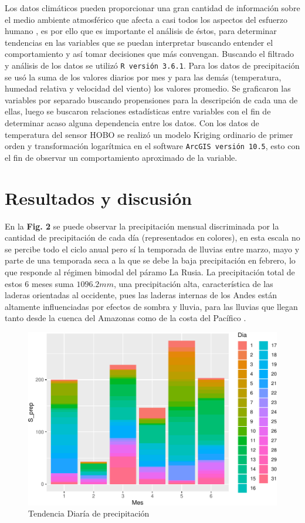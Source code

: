 \documentclass[conference,final,]{IEEEtran}
\makeatletter
\def\maxwidth{\ifdim\Gin@nat@width>\linewidth\linewidth
\else\Gin@nat@width\fi}
\let\Oldincludegraphics\includegraphics
\renewcommand{\includegraphics}[1]{\Oldincludegraphics[width=\maxwidth]{#1}}
\makeatother
\begin{document}
Los datos climáticos pueden proporcionar una gran cantidad de
información sobre el medio ambiente atmosférico que afecta a casi todos
los aspectos del esfuerzo humano \cite{Bala}, es por ello que es
importante el análisis de éstos, para determinar tendencias en las
variables que se puedan interpretar buscando entender el comportamiento
y así tomar decisiones que más convengan. Buscando el filtrado y
análisis de los datos se utilizó \texttt{R\ versión\ 3.6.1}. Para los
datos de precipitación se usó la suma de los valores diarios por mes y
para las demás (temperatura, humedad relativa y velocidad del viento)
los valores promedio. Se graficaron las variables por separado buscando
propensiones para la descripción de cada una de ellas, luego se buscaron
relaciones estadísticas entre variables con el fin de determinar acaso
alguna dependencia entre los datos. Con los datos de temperatura del
sensor HOBO se realizó un modelo Kriging ordinario de primer orden y
transformación logarítmica en el software
\texttt{ArcGIS\ versión\ 10.5}, esto con el fin de observar un
comportamiento aproximado de la variable.

\hypertarget{resultados-y-discusiuxf3n}{%
\section{Resultados y discusión}\label{resultados-y-discusiuxf3n}}

En la \textbf{Fig. 2} se puede observar la precipitación mensual
discriminada por la cantidad de precipitación de cada día (representados
en colores), en esta escala no se percibe todo el ciclo anual pero sí la
temporada de lluvias entre marzo, mayo y parte de una temporada seca a
la que se debe la baja precipitación en febrero, lo que responde al
régimen bimodal del páramo La Rusia. La precipitación total de estos 6
meses suma \(1096.2mm\), una precipitación alta, característica de las
laderas orientadas al occidente, pues las laderas internas de los Andes
están altamente influenciadas por efectos de sombra y lluvia, para las
lluvias que llegan tanto desde la cuenca del Amazonas como de la costa
del Pacífico \cite{buytaert2006hidrologia,}.

\begin{figure}
\centering
\includegraphics{Hidrology_files/figure-latex/unnamed-chunk-1-1.pdf}
\caption{Tendencia Diaría de precipitación}
\end{figure}
\end{document}
